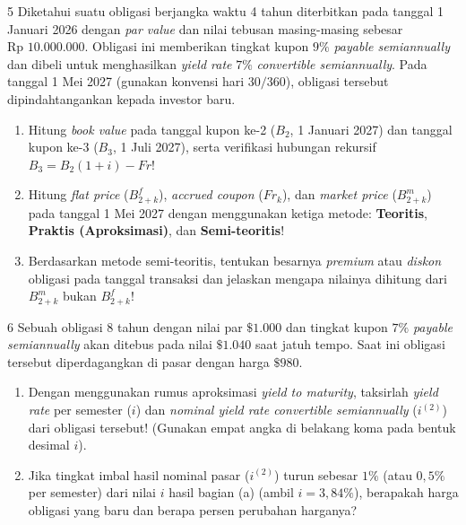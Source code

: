 \documentclass[11pt,a4paper]{article}
\begin{document}
\begin{naskahsoalbox}{5}
Diketahui suatu obligasi berjangka waktu 4 tahun diterbitkan pada tanggal 1 Januari 2026 dengan \textit{par value} dan nilai tebusan masing-masing sebesar $\text{Rp }10.000.000$. Obligasi ini memberikan tingkat kupon $9\%$ \textit{payable semiannually} dan dibeli untuk menghasilkan \textit{yield rate} $7\%$ \textit{convertible semiannually}. Pada tanggal 1 Mei 2027 (gunakan konvensi hari $30/360$), obligasi tersebut dipindahtangankan kepada investor baru.
\begin{enumerate}[label=(\alph*), leftmargin=6mm, topsep=1pt, itemsep=2pt]
    \item Hitung \textit{book value} pada tanggal kupon ke-2 ($B_2$, 1 Januari 2027) dan tanggal kupon ke-3 ($B_3$, 1 Juli 2027), serta verifikasi hubungan rekursif $B_3 = B_2(1+i) - Fr$!
    \item Hitung \textit{flat price} ($B_{2+k}^f$), \textit{accrued coupon} ($Fr_k$), dan \textit{market price} ($B_{2+k}^m$) pada tanggal 1 Mei 2027 dengan menggunakan ketiga metode: \textbf{Teoritis}, \textbf{Praktis (Aproksimasi)}, dan \textbf{Semi-teoritis}!
    \item Berdasarkan metode semi-teoritis, tentukan besarnya \textit{premium} atau \textit{diskon} obligasi pada tanggal transaksi dan jelaskan mengapa nilainya dihitung dari $B_{2+k}^m$ bukan $B_{2+k}^f$!
\end{enumerate}
\end{naskahsoalbox}

\begin{naskahsoalbox}{6}
Sebuah obligasi 8 tahun dengan nilai par $\$1.000$ dan tingkat kupon $7\%$ \textit{payable semiannually} akan ditebus pada nilai $\$1.040$ saat jatuh tempo. Saat ini obligasi tersebut diperdagangkan di pasar dengan harga $\$980$.
\begin{enumerate}[label=(\alph*), leftmargin=6mm, topsep=1pt, itemsep=2pt]
    \item Dengan menggunakan rumus aproksimasi \textit{yield to maturity}, taksirlah \textit{yield rate} per semester ($i$) dan \textit{nominal yield rate convertible semiannually} ($i^{(2)}$) dari obligasi tersebut! (Gunakan empat angka di belakang koma pada bentuk desimal $i$).
    \item Jika tingkat imbal hasil nominal pasar ($i^{(2)}$) turun sebesar $1\%$ (atau $0{,}5\%$ per semester) dari nilai $i$ hasil bagian (a) (ambil $i = 3{,}84\%$), berapakah harga obligasi yang baru dan berapa persen perubahan harganya?
\end{enumerate}
\end{naskahsoalbox}
\end{document}
